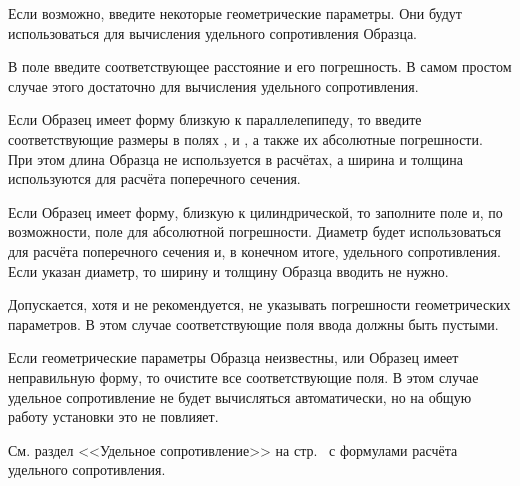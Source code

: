 Если возможно, введите некоторые геометрические параметры. Они будут использоваться для вычисления удельного сопротивления Образца. 

В поле  введите соответствующее расстояние и его погрешность. В самом простом случае этого достаточно для вычисления удельного сопротивления.

Если Образец имеет форму близкую к параллелепипеду, то введите соответствующие размеры в полях ,  и , а также их абсолютные погрешности. При этом длина Образца не используется в расчётах, а ширина и толщина используются для расчёта поперечного сечения.

Если Образец имеет форму, близкую к цилиндрической, то заполните поле  и, по возможности, поле для абсолютной погрешности. Диаметр будет использоваться для расчёта поперечного сечения и, в конечном итоге, удельного сопротивления. Если указан диаметр, то ширину и толщину Образца вводить не нужно.

Допускается, хотя и не рекомендуется, не указывать погрешности геометрических параметров. В этом случае соответствующие поля ввода должны быть пустыми.

Если геометрические параметры Образца неизвестны, или Образец имеет неправильную форму, то очистите все соответствующие поля. В этом случае удельное сопротивление не будет вычисляться автоматически, но на общую работу установки это не повлияет.

См. раздел <<Удельное сопротивление>> на стр.~\pageref{sec_rho_calcs} с формулами расчёта удельного сопротивления.